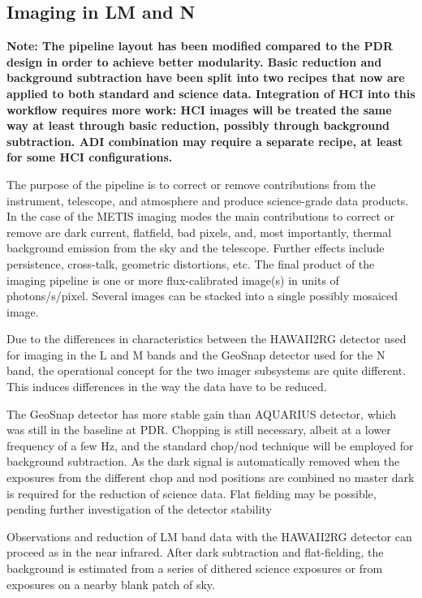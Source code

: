 \subsection{Imaging in LM and N}
\label{ssec:overview_lm_imaging}

\textbf{Note: The pipeline layout has been modified compared to the
  PDR design in order to achieve better modularity. Basic reduction
  and background subtraction have been split into two recipes that now
  are applied to both standard and science data. Integration of \ac{HCI}
  into this workflow requires more work: \ac{HCI} images will be treated
  the same way at least through basic reduction, possibly through
  background subtraction. \ac{ADI} combination may require a separate
  recipe, at least for some \ac{HCI} configurations.}

The purpose of the pipeline is to correct or remove contributions from
the instrument, telescope, and atmosphere and produce science-grade
data products.  In the case of the METIS imaging modes the main
contributions to correct or remove are dark current, flatfield, bad
pixels, and, most importantly, thermal background emission from the
sky and the telescope. Further effects include persistence,
cross-talk, geometric distortions, etc. The final product of the
imaging pipeline is one or more flux-calibrated image(s) in units of
photons/s/pixel. Several images can be stacked into a single possibly
mosaiced image.

Due to the differences in characteristics between the HAWAII2RG
detector used for imaging in the L and M bands and the GeoSnap
detector used for the N band, the operational concept for the two
imager subsystems are quite different. This induces differences in the
way the data have to be reduced.

The GeoSnap detector has more stable gain than AQUARIUS detector,
which was still in the baseline at PDR.  Chopping is still necessary,
albeit at a lower frequency of a few Hz, and the standard chop/nod
technique will be employed for background subtraction.  As the dark
signal is automatically removed when the exposures from the different
chop and nod positions are combined no master dark is required for the
reduction of science data. Flat fielding may be possible, pending
further investigation of the detector stability

Observations and reduction of LM band data with the HAWAII2RG detector
can proceed as in the near infrared. After dark subtraction and
flat-fielding, the background is estimated from a series of dithered
science exposures or from exposures on a nearby blank patch of sky.

